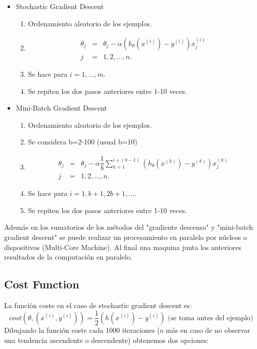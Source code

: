\documentclass[12pt,a4paper]{article}
\begin{document}
\begin{itemize}
\item Stochastic Gradient Descent
\begin{enumerate}
\item Ordenamiento aleatorio de los ejemplos.
\item 
\begin{eqnarray*}
\theta_j &=& \theta_j - \alpha (h_{\theta}(x^{(i)})-y^{(i)})x_j^{(i)}   \\
j &=& 1,2,...,n.
\end{eqnarray*}
\item Se hace para $i=1,...,m$.
\item Se repiten los dos pasos anteriores entre 1-10 veces.
\end{enumerate}
\item Mini-Batch Gradient Descent
\begin{enumerate}
\item Ordenamiento aleatorio de los ejemplos.
\item Se considera b=2-100 (usual b=10)
\item 
\begin{eqnarray*}
\theta_j &=& \theta_j - \alpha \dfrac{1}{b} \sum_{k=1}^{i+(b-1)} (h_{\theta}(x^{(k)})-y^{(k)})x_j^{(k)}   \\
j &=& 1,2,...,n.
\end{eqnarray*}
\item Se hace para $i=1,b+1,2b+1,...$.
\item Se repiten los dos pasos anteriores entre 1-10 veces.
\end{enumerate}
\end{itemize}

Además en los sumatorios de los métodos del "gradiente descenso" y "mini-batch gradient descent" se puede realizar un procesamiento en paralelo por núcleos o dispositivos (Multi-Core Machine). Al final una maquina junta los anteriores resultados de la computación en paralelo.

\subsection{Cost Function}
La función coste en el caso de stochastic gradient descent es:
\begin{equation*}
cost(\theta,(x^{(i)},y^{(i)})) = \dfrac{1}{2} (h(x^{(i)})-y^{(i)}) \mbox{ (se toma antes del ejemplo)}
\end{equation*}
Dibujando la función coste cada 1000 iteraciones (o más en caso de no observar una tendencia ascendente o descendente) obtenemos dos opciones:
\end{document}
